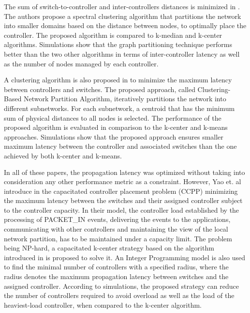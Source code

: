 \documentclass{IEEEtran}
\begin{document}
The sum of switch-to-controller and inter-controllers distances is minimized in \cite{SaSa16}. The authors propose a spectral clustering algorithm that partitions the network into smaller domains based on the distance between nodes, to optimally place the controller. The proposed algorithm is compared to k-median and k-center algorithms. Simulations show that the graph partitioning technique performs better than the two other algorithms in terms of inter-controller latency as well as the number of nodes managed by each controller. 

A clustering algorithm is also proposed in \cite{WaZh17} to minimize the maximum latency between controllers and switches. The proposed approach, called Clustering-Based Network Partition Algorithm, iteratively partitions the network into different subnetworks. For each subnetwork, a centroid that has the minimum sum of physical distances to all nodes is selected. The performance of the proposed algorithm is evaluated in comparison to the k-center and k-means approaches. Simulations show that the proposed approach ensures smaller maximum latency between the controller and associated switches than the one achieved by both k-center and k-means.

In all of these papers, the propagation latency was optimized without taking into consideration any other performance metric as a constraint. However, Yao et. al  introduce in \cite{YaBi14} the capacitated controller placement problem (CCPP) minimizing the maximum latency between the switches and their assigned controller subject to the controller capacity. In their model, the controller load established by the processing of PACKET\_IN events, delivering the events to the applications, communicating with other controllers and maintaining the view of the local network partition, has to be maintained under a capacity limit. The problem being NP-hard, a capacitated k-center strategy based on the algorithm introduced in \cite{OzPi06} is proposed to solve it. An Integer Programming model is also used to find the minimal number of controllers with a specified radius, where the radius denotes the maximum propagation latency between switches and the assigned controller. According to simulations, the proposed strategy can reduce the number of controllers required to avoid overload as well as the load of the heaviest-load controller, when compared to the k-center algorithm. 
\end{document}
